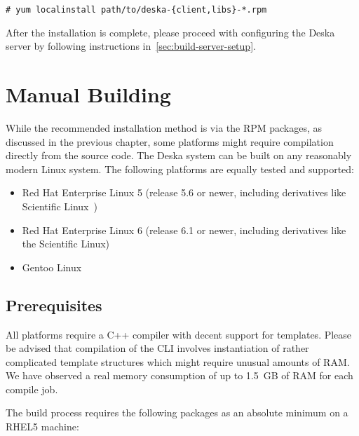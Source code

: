 \documentclass[deska]{subfiles}
\begin{document}
\begin{verbatim}
# yum localinstall path/to/deska-{client,libs}-*.rpm
\end{verbatim}

After the installation is complete, please proceed with configuring the Deska server by following instructions
in~\ref{sec:build-server-setup}.

\section{Manual Building}

While the recommended installation method is via the RPM packages, as discussed in the previous chapter, some platforms
might require compilation directly from the source code.  The Deska system can be built on any reasonably modern Linux
system.  The following platforms are equally tested and supported:

\begin{itemize}
    \item Red Hat Enterprise Linux \cite{rhel} 5 (release 5.6 or newer, including derivatives like Scientific
        Linux~\cite{scientific-linux})
    \item Red Hat Enterprise Linux 6 (release 6.1 or newer, including derivatives like the Scientific Linux)
    \item Gentoo Linux~\cite{gentoo}
\end{itemize}

\subsection{Prerequisites}

All platforms require a C++ compiler with decent support for templates.  Please be advised that compilation of the CLI
involves instantiation of rather complicated template structures which might require unusual amounts of RAM.  We have
observed a real memory consumption of up to 1.5~GB of RAM for each compile job.

The build process requires the following packages as an absolute minimum on a RHEL5 machine:
\end{document}
